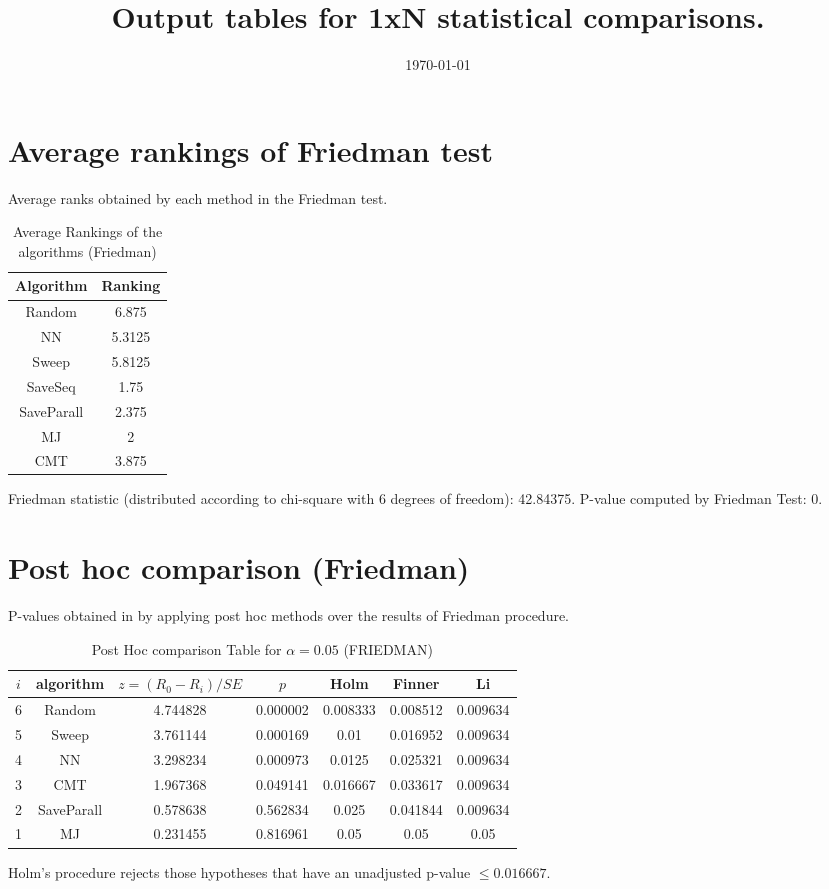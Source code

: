 \documentclass[a4paper,10pt]{article}
\title{Output tables for 1xN statistical comparisons.}
\author{}
\date{\today}
\begin{document}
\begin{landscape}
\pagestyle{empty}
\maketitle
\thispagestyle{empty}

\section{Average rankings of Friedman test}


Average ranks obtained by each method in the Friedman test.

\begin{table}[!htp]
\centering
\begin{tabular}{|c|c|}\hline
Algorithm&Ranking\\\hline
Random&6.875\\NN&5.3125\\Sweep&5.8125\\SaveSeq&1.75\\SaveParall&2.375\\MJ&2\\CMT&3.875\\\hline\end{tabular}
\caption{Average Rankings of the algorithms (Friedman)}
\end{table}

Friedman statistic (distributed according to chi-square with 6 degrees of freedom): 42.84375. \newline P-value computed by Friedman Test: 0.\newline


\newpage

\section{Post hoc comparison (Friedman)}


P-values obtained in by applying post hoc methods over the results of Friedman procedure.

\begin{table}[!htp]
\centering\footnotesize
\begin{tabular}{ccccccc}
$i$&algorithm&$z=(R_0 - R_i)/SE$&$p$&Holm &Finner&Li\\
\hline6&Random&4.744828&0.000002&0.008333&0.008512&0.009634\\5&Sweep&3.761144&0.000169&0.01&0.016952&0.009634\\4&NN&3.298234&0.000973&0.0125&0.025321&0.009634\\3&CMT&1.967368&0.049141&0.016667&0.033617&0.009634\\2&SaveParall&0.578638&0.562834&0.025&0.041844&0.009634\\1&MJ&0.231455&0.816961&0.05&0.05&0.05\\\hline
\end{tabular}
\caption{Post Hoc comparison Table for $\alpha=0.05$ (FRIEDMAN)}
\end{table}Holm's procedure rejects those hypotheses that have an unadjusted p-value $\le0.016667$.


\end{landscape}
\end{document}
